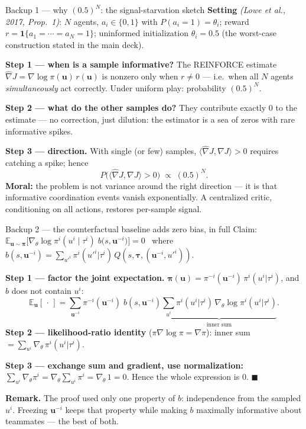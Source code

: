 \documentclass[10pt, aspectratio=169]{beamer}
\newcommand{\paper}[1]{\textcolor{mLightBrown}{\small\textit{(#1)}}}
\begin{document}
\begin{frame}{Backup 1 --- why $(0.5)^N$: the signal-starvation sketch}
\footnotesize
\textbf{Setting} \paper{Lowe et al., 2017, Prop.\ 1}: $N$ agents, $a_i \in \{0,1\}$ with $P(a_i{=}1)=\theta_i$; reward $r = \mathbf{1}\{a_1 = \cdots = a_N = 1\}$; uninformed initialization $\theta_i = 0.5$ (the worst-case construction stated in the main deck).
\medskip

\textbf{Step 1 --- when is a sample informative?} The REINFORCE estimate $\hat\nabla J = \nabla\log\pi(\mathbf{u})\, r(\mathbf{u})$ is nonzero only when $r\neq 0$ --- i.e.\ when all $N$ agents \emph{simultaneously} act correctly. Under uniform play: probability $(0.5)^N$.
\medskip

\textbf{Step 2 --- what do the other samples do?} They contribute exactly $0$ to the estimate --- no correction, just dilution: the estimator is a sea of zeros with rare informative spikes.
\medskip

\textbf{Step 3 --- direction.} With single (or few) samples, $\langle\hat\nabla J, \nabla J\rangle > 0$ requires catching a spike; hence
\[
P\big(\langle\hat\nabla J,\nabla J\rangle > 0\big) \;\propto\; (0.5)^N .
\]
\medskip
\textbf{Moral:} the problem is not variance around the right direction --- it is that \alert{informative coordination events vanish exponentially}. A centralized critic, conditioning on all actions, restores per-sample signal.
\end{frame}

\begin{frame}{Backup 2 --- the counterfactual baseline adds zero bias, in full}
\footnotesize
Claim: $\displaystyle \mathbb{E}_{\mathbf{u}\sim\bm\pi}\Big[ \nabla_\theta \log \pi^i(u^i\mid\tau^i)\; b\big(s,\mathbf{u}^{-i}\big) \Big] = 0$ \, where $b(s,\mathbf{u}^{-i}) = \sum_{u'^i}\pi^i(u'^i|\tau^i)\, Q(s,\boldsymbol\tau,(\mathbf{u}^{-i},u'^i))$.
\medskip

\textbf{Step 1 --- factor the joint expectation.} $\bm\pi(\mathbf{u}) = \pi^{-i}(\mathbf{u}^{-i})\,\pi^i(u^i|\tau^i)$, and $b$ does not contain $u^i$:
\[
\mathbb{E}_{\mathbf{u}}[\,\cdot\,] = \sum_{\mathbf{u}^{-i}} \pi^{-i}(\mathbf{u}^{-i})\; b(s,\mathbf{u}^{-i}) \underbrace{\sum_{u^i} \pi^i(u^i|\tau^i)\, \nabla_\theta\log\pi^i(u^i|\tau^i)}_{\text{inner sum}}.
\]
\textbf{Step 2 --- likelihood-ratio identity} ($\pi\nabla\log\pi = \nabla\pi$): inner sum $= \sum_{u^i} \nabla_\theta\, \pi^i(u^i|\tau^i)$.
\medskip

\textbf{Step 3 --- exchange sum and gradient, use normalization:} $\sum_{u^i}\nabla_\theta\pi^i = \nabla_\theta \sum_{u^i}\pi^i = \nabla_\theta\,1 = 0$. Hence the whole expression is $0$. \hfill$\blacksquare$
\medskip

\textbf{Remark.} The proof used only one property of $b$: \alert{independence from the sampled $u^i$}. Freezing $\mathbf{u}^{-i}$ keeps that property while making $b$ maximally informative about teammates --- the best of both.
\end{frame}
\end{document}
